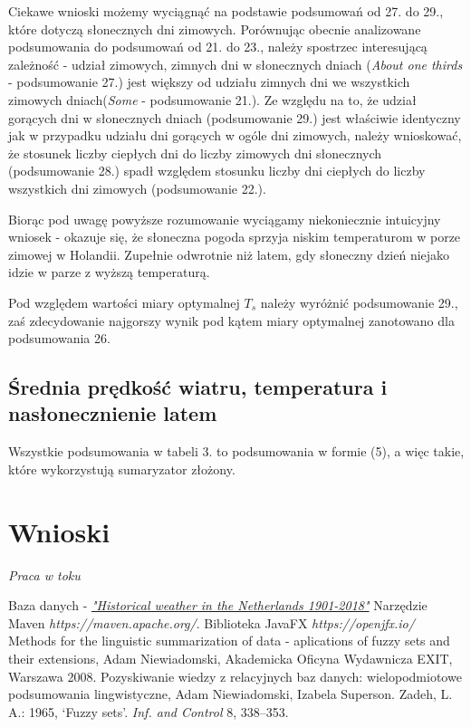 \documentclass{classrep}
\begin{document}
Ciekawe wnioski możemy wyciągnąć na podstawie podsumowań od 27. do 29., które dotyczą słonecznych dni zimowych. Porównując obecnie analizowane podsumowania do podsumowań od 21. do 23., należy spostrzec interesującą zależność - udział zimowych, zimnych dni w słonecznych dniach (\textit{About one thirds} - podsumowanie 27.) jest większy od udziału zimnych dni we wszystkich zimowych dniach(\textit{Some} - podsumowanie 21.). Ze względu na to, że udział gorących dni w słonecznych dniach (podsumowanie 29.) jest właściwie identyczny jak w przypadku udziału dni gorących w ogóle dni zimowych, należy wnioskować, że stosunek liczby ciepłych dni do liczby zimowych dni słonecznych (podsumowanie 28.) spadł względem stosunku liczby dni ciepłych do liczby wszystkich dni zimowych (podsumowanie 22.).\newline

Biorąc pod uwagę powyższe rozumowanie wyciągamy niekoniecznie intuicyjny wniosek - okazuje się, że słoneczna pogoda sprzyja niskim temperaturom w porze zimowej w Holandii. Zupełnie odwrotnie niż latem, gdy słoneczny dzień niejako idzie w parze z wyższą temperaturą.\newline

Pod względem wartości miary optymalnej $T_s$ należy wyróżnić podsumowanie 29., zaś zdecydowanie najgorszy wynik pod kątem miary optymalnej zanotowano dla podsumowania 26.


\subsection{Średnia prędkość wiatru, temperatura i nasłonecznienie latem}
Wszystkie podsumowania w tabeli 3. to podsumowania w formie (5), a więc takie, które wykorzystują sumaryzator złożony.\newline

\section{Wnioski}
\textit{Praca w toku}


\begin{thebibliography}{5}
Baza danych - 
\href{https://www.kaggle.com/sinaasappel/historical-weather-in-the-netherlands-19012018}{\textit{"Historical weather in the Netherlands 1901-2018"}}
Narzędzie Maven\newline
\textit{https://maven.apache.org/}. 
Biblioteka JavaFX\newline
\textit{https://openjfx.io/}
Methods for the linguistic summarization of data - aplications of fuzzy sets and their extensions, Adam Niewiadomski, Akademicka Oficyna Wydawnicza EXIT, Warszawa 2008.
Pozyskiwanie wiedzy z relacyjnych baz danych: wielopodmiotowe podsumowania lingwistyczne, Adam Niewiadomski, Izabela Superson.
Zadeh, L. A.: 1965, ‘Fuzzy sets’.  \textit{Inf. and Control} 8, 338–353.
\end{thebibliography}
\end{document}
